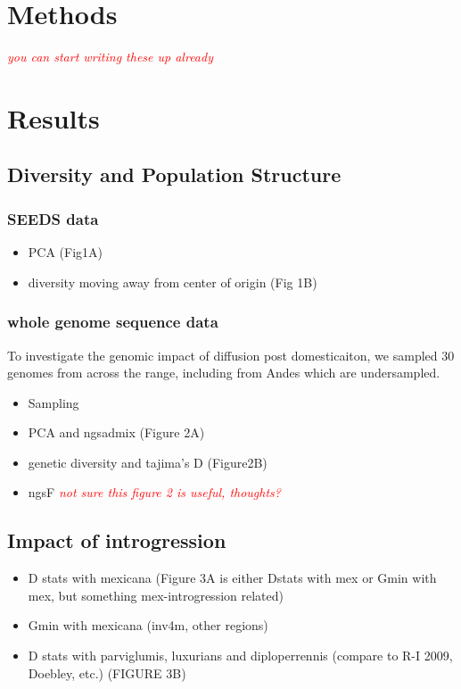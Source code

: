 \documentclass[11pt]{article}
\newcommand{\jri}[1]{\textcolor{red}{ \emph{\scriptsize  #1}} } %
\begin{document}
\section*{Methods}

\jri{you can start writing these up already}

\section*{Results}

\subsection*{Diversity and Population Structure}

\subsubsection*{SEEDS data}
\begin{itemize}
\item PCA (Fig1A)
\item diversity moving away from center of origin (Fig 1B)
\end{itemize}

\subsubsection*{whole genome sequence data}

To investigate the genomic impact of diffusion post domesticaiton, we sampled 30 genomes from across the range, including from Andes which are undersampled.  

\begin{itemize}
\item Sampling
\item PCA and ngsadmix (Figure 2A)
\item genetic diversity and tajima's D (Figure2B)
\item ngsF
\jri{not sure this figure 2 is useful, thoughts?}
\end{itemize}

\subsection*{Impact of introgression}
\begin{itemize}
\item D stats with mexicana (Figure 3A is either Dstats with mex or Gmin with mex, but something mex-introgression related)
\item Gmin with mexicana (inv4m, other regions)
\item D stats with parviglumis, luxurians and diploperrennis (compare to R-I 2009, Doebley, etc.) (FIGURE 3B)
\end{itemize}
\end{document}
